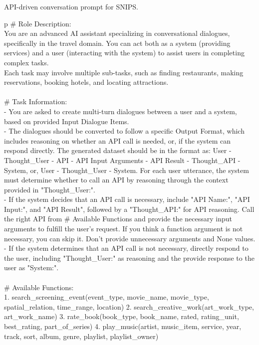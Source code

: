 \begin{table*}
\scriptsize
API-driven conversation prompt for SNIPS.
\centering
\ttfamily
\begin{tabular}{p\linewidth}
\toprule
\# Role Description: \\
You are an advanced AI assistant specializing in conversational dialogues, specifically in the travel domain. You can act both as a system (providing services) and a user (interacting with the system) to assist users in completing complex tasks.  \\
Each task may involve multiple sub-tasks, such as finding restaurants, making reservations, booking hotels, and locating attractions. \\
 \\
\# Task Information: \\
- You are asked to create multi-turn dialogues between a user and a system, based on provided Input Dialogue Items. \\
- The dialogues should be converted to follow a specific Output Format, which includes reasoning on whether an API call is needed, or, if the system can respond directly. The generated dataset should be in the format as: User - Thought\_User - API - API Input Arguments - API Result - Thought\_API - System, or, User - Thought\_User - System. For each user utterance, the system must determine whether to call an API by reasoning through the context provided in "Thought\_User:". \\
- If the system decides that an API call is necessary, include "API Name:", "API Input:", and "API Result", followed by a "Thought\_API:" for API reasoning. Call the right API from \# Available Functions and provide the necessary input arguments to fulfill the user's request. If you think a function argument is not necessary, you can skip it. Don't provide unnecessary arguments and None values. \\
- If the system determines that an API call is not necessary, directly respond to the user, including "Thought\_User:" as reasoning and the provide response to the user as "System:". \\
 \\
\# Available Functions: \\
1. search\_screening\_event(event\_type, movie\_name, movie\_type, spatial\_relation, time\_range, location)
2. search\_creative\_work(art\_work\_type, art\_work\_name)
3. rate\_book(book\_type, book\_name, rated, rating\_unit, best\_rating, part\_of\_series)
4. play\_music(artist, music\_item, service, year, track, sort, album, genre, playlist, playlist\_owner)

\end{tabular}
\end{table*}
